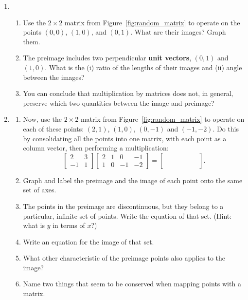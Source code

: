\documentclass[../textbook.tex]{subfiles}
\begin{document}
\begin{enumerate}
\item \begin{enumerate}
\item Use the $2\times 2$ matrix from Figure~\ref{fig:random_matrix} to operate on the points $(0,0)$, $(1,0)$, and $(0,1)$. What are their images? Graph them.
\item The preimage includes two perpendicular \textbf{unit vectors}, $(0,1)$ and $(1,0)$. What is the (i) ratio of the lengths of their images and (ii) angle between the images?
\item You can conclude that multiplication by matrices does not, in general, preserve which two quantities between the image and preimage?
\end{enumerate}
\item \label{prob:consolidate_matrix} \begin{enumerate}
\item Now, use the $2\times 2$ matrix from Figure~\ref{fig:random_matrix} to operate on each of these points: $(2,1)$, $(1,0)$, $(0,-1)$ and $(-1,-2)$. Do this by consolidating all the points into one matrix, with each point as a column vector, then performing a multiplication:
$$\left[\begin{array}{cc}2 & 3 \\ -1 & 1 \end{array}\right]
\left[\begin{array}{cccc}2 & 1 & 0 & -1 \\ 1 & 0 & -1 & -2\end{array}\right]
=\left[\begin{array}{cccc}\phantom{0} & \phantom{0} & \phantom{0} & \phantom{0} \\ \phantom{0}\end{array}\right].$$
\item Graph and label the preimage and the image of each point onto the same set of axes.
\item The points in the preimage are discontinuous, but they belong to a particular, infinite set of points. Write the equation of that set. (Hint: what is $y$ in terms of $x$?)
\item Write an equation for the image of that set.
\item What other characteristic of the preimage points also applies to the image?
\item Name two things that seem to be conserved when mapping points with a matrix.
\end{enumerate}
\setcounter{mp_problem_i}{\value{enumi}}
\end{enumerate}
\end{document}
